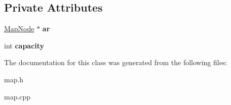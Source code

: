 \subsection*{Private Attributes}
\begin{DoxyCompactItemize}
\item 
\mbox{\label{class_map_a60146aa4b52ce279c71ab2d454713ba8}} 
\hyperlink{class_map_node}{Map\+Node} $\ast$ {\bfseries ar}
\item 
\mbox{\label{class_map_a5317a76ed7e281b2b9dd6726e2e836a9}} 
int {\bfseries capacity}
\end{DoxyCompactItemize}


The documentation for this class was generated from the following files\+:\begin{DoxyCompactItemize}
\item 
map.\+h\item 
map.\+cpp\end{DoxyCompactItemize}
